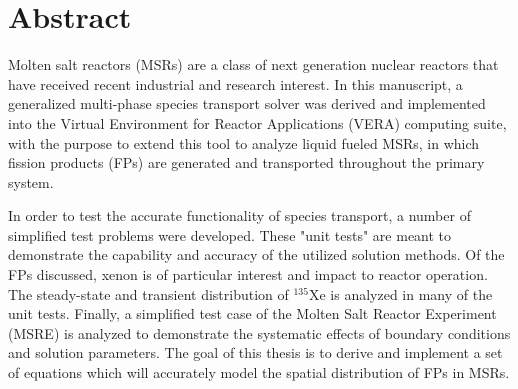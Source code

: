 \chapter*{Abstract}\label{ch:abstract}
Molten salt reactors (MSRs) are a class of next generation nuclear reactors that have received recent industrial and research interest. In this manuscript, a generalized multi-phase species transport solver was derived and implemented into the Virtual Environment for Reactor Applications (VERA) computing suite, with the purpose to extend this tool to analyze liquid fueled MSRs, in which fission products (FPs) are generated and transported throughout the primary system. 

In order to test the accurate functionality of species transport, a number of simplified test problems were developed. These "unit tests" are meant to demonstrate the capability and accuracy of the utilized solution methods. Of the FPs discussed, xenon is of particular interest and impact to reactor operation. The steady-state and transient distribution of ${}^{135}$Xe is analyzed in many of the unit tests. Finally, a simplified test case of the Molten Salt Reactor Experiment (MSRE) is analyzed to demonstrate the systematic effects of boundary conditions and solution parameters. The goal of this thesis is to derive and implement a set of equations which will accurately model the spatial distribution of FPs in MSRs.